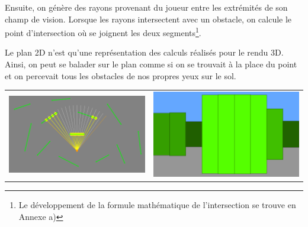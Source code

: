 \documentclass[11pt,french,a4paper,]{article}
\begin{document}
Ensuite, on génère des rayons provenant du joueur entre les extrémités
de son champ de vision. Lorsque les rayons intersectent avec un
obstacle, on calcule le point d'intersection où se joignent les deux
segments\footnote{Le développement de la formule mathématique de
  l'intersection se trouve en Annexe a)}.

Le plan 2D n'est qu'une représentation des calculs réalisés pour le
rendu 3D. Ainsi, on peut se balader sur le plan comme si on se trouvait
à la place du point et on percevait tous les obstacles de nos propres
yeux sur le sol.

\begin{longtable}[]{@{}cc@{}}
\toprule
\endhead
\begin{minipage}[t]{0.47\columnwidth}\centering
\includegraphics{../img/IntersectionComparison/rays_intersections.png}\strut
\end{minipage} & \begin{minipage}[t]{0.47\columnwidth}\centering
\includegraphics{../img/IntersectionComparison/3d_simple_raycast.png}\strut
\end{minipage}\tabularnewline

\end{longtable}
\end{document}
